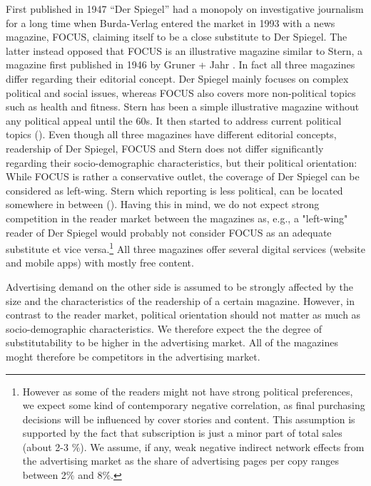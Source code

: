 \documentclass[12pt,a4paper]{scrreprt}
\begin{document}
First published in 1947 ``Der Spiegel'' had a monopoly on investigative journalism for a long time when Burda-Verlag entered the market in 1993 with a news magazine, FOCUS, claiming itself to be a close substitute to Der Spiegel. The latter instead opposed that FOCUS is an illustrative magazine similar to Stern, a magazine first published in 1946 by Gruner + Jahr \cite{kaltenhaeuser_abstimmung_2005}. In fact all three magazines differ regarding their editorial concept. Der Spiegel mainly focuses on complex political and social issues, whereas FOCUS also covers more non-political topics such as health and fitness. Stern has been a simple illustrative magazine without any political appeal until the 60s. It then started to address current political topics (\cite{vogel_populaere_1998}). Even though all three magazines have different editorial concepts, readership of Der Spiegel, FOCUS and Stern does not differ significantly regarding their socio-demographic characteristics, but their political orientation: While FOCUS is rather a conservative outlet, the coverage of Der Spiegel can be considered as left-wing. Stern which reporting is less political, can be located somewhere in between (\cite{kaltenhaeuser_abstimmung_2005}). Having this in mind, we do not expect strong competition in the reader market between the magazines as, e.g., a "left-wing" reader of Der Spiegel would probably not consider FOCUS as an adequate substitute et vice versa.\footnote{However as some of the readers might not have strong political preferences, we expect some kind of contemporary negative correlation, as final purchasing decisions will be influenced by cover stories and content. This assumption is supported by the fact that subscription is just a minor part of total sales (about 2-3 $\%$). We assume, if any, weak negative indirect network effects from the advertising market as the share of advertising pages per copy ranges between 2$\%$ and 8$\%$.} All three magazines offer several digital services (website and mobile apps) with mostly free content. 

Advertising demand on the other side is assumed to be strongly affected by the size and the characteristics of the readership of a certain magazine. However, in contrast to the reader market, political orientation should not matter as much as socio-demographic characteristics. We therefore expect the the degree of substitutability to be higher in the advertising market. All of the magazines moght therefore be competitors in the advertising market.  

\end{document}
